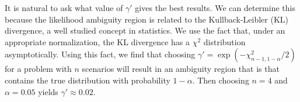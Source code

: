 \documentclass[12pt]{amsart}
\begin{document}
It is natural to ask what value of $\gamma'$ gives the best results.
We can determine this because the likelihood ambiguity region is related to the Kullback-Leibler (KL) divergence, a well studied concept in statistics.
We use the fact that, under an appropriate normalization, the KL divergence has a $\chi^2$ distribution asymptotically.
Using this fact, we find that choosing $\gamma' = \exp(-\chi^2_{n-1,1-\alpha}/2)$ for a problem with $n$ scenarios will result in an ambiguity region that is that contains the true distribution with probability $1-\alpha$.
Then choosing $n = 4$ and $\alpha = 0.05$ yields $\gamma' \approx 0.02$.


% 
\end{document}
